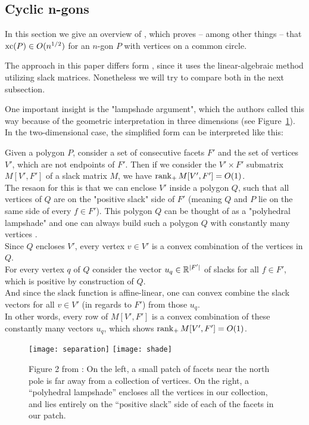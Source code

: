 \subsection{Cyclic n-gons}

In this section we give an overview of \cite{kwan2020extension}, which proves -- among other things -- that $\operatorname{xc}(P) \in O(n^{1/2})$ for an $n$-gon $P$ with vertices on a common circle.

The approach in this paper differs form \cite{shitov2020sublinear}, since it uses the linear-algebraic method utilizing slack matrices. Nonetheless we will try to compare both in the next subsection.

One important insight is the "lampshade argument", which the authors called this way because of the geometric interpretation in three dimensions (see Figure~\ref{fig:lampshade}). In the two-dimensional case, the simplified form can be interpreted like this:

Given a polygon $P$, consider a set of consecutive facets $F'$ and the set of vertices $V'$, which are not endpoints of $F'$. Then if we consider the $V' \times F'$ submatrix $M[V',F']$ of a slack matrix $M$, we have $\operatorname{rank}_+ M[V',F'] = O(1)$.\\
The resaon for this is that we can enclose $V'$ inside a polygon $Q$, such that all vertices of $Q$ are on the "positive slack" side of $F'$ (meaning $Q$ and $P$ lie on the same side of every $f \in F'$). This polygon $Q$ can be thought of as a "polyhedral lampshade" and one can always build such a polygon $Q$ with constantly many vertices .\\
Since $Q$ encloses $V'$, every vertex $v \in V'$ is a convex combination of the vertices in $Q$.\\
For every vertex $q$ of $Q$ consider the vector $u_q \in \mathbb{R}^{\lvert F'\rvert}$ of slacks for all $f \in F'$, which is positive by construction of $Q$.\\
And since the slack function is affine-linear, one can convex combine the slack vectors for all $v \in V'$ (in regards to $F'$) from those $u_q$.\\
In other words, every row of $M[V',F']$ is a convex combination of these constantly many vectors $u_q$, which shows $\operatorname{rank}_+ M[V',F'] = O(1)$.

\begin{figure}[h]
  \centering
  \texttt{[image: separation]}
  \texttt{[image: shade]}
  \caption{Figure 2 from \cite{kwan2020extension}: On the left, a small patch of facets near the north pole is far away from a collection of vertices. On the right, a ``polyhedral lampshade'' encloses all the vertices in our collection, and lies entirely on the ``positive slack'' side of each of the facets in our patch.}
  \label{fig:lampshade}
\end{figure}

